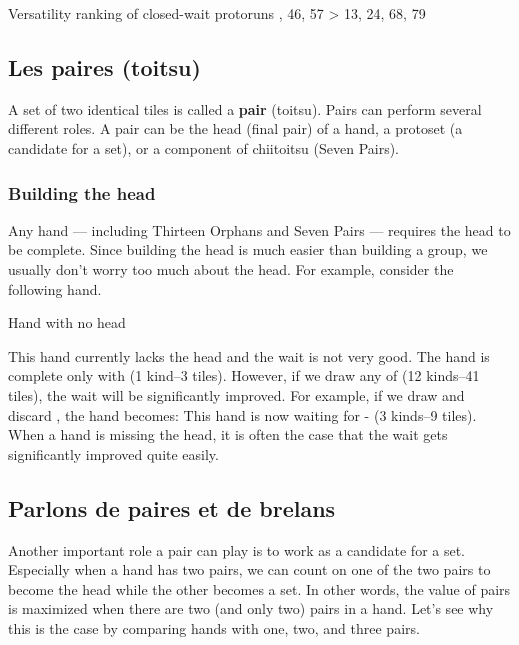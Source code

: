 {\color{MyRed}
\begin{itembox}[c]{Versatility ranking of closed-wait protoruns}
\centering{}, 46, 57 > 13, 24, 68, 79
\end{itembox} 
\normalcolor
\bigskip

\subsection{Les paires ({\jap toitsu})}\label{sec:closevers}
 

A set of two identical tiles is called a {\bf pair} ({\jap toitsu}). 
Pairs can perform several different roles. A pair can be the head (final pair) of a hand, a protoset (a candidate for a set), or a component of {\jap chiitoitsu} (Seven Pairs). 

\bigskip
\subsubsection{Building the head}
Any hand --- including Thirteen Orphans and Seven Pairs --- requires the head to be complete. Since building the head is much easier than building a group, we usually don't worry too much about the head. For example, consider the following hand. 
\bigskip
\begin{itembox}[r]{Hand with no head}
\bp
{}
\ep
\end{itembox}
This hand currently lacks the head and the wait is not very good. The hand is complete only with {\LARGE{}} (1 kind--3 tiles).
However, if we draw any of {\LARGE{}} (12 kinds--41 tiles), the wait will be significantly improved. 
For example, if we draw {\LARGE{}} and discard {\LARGE{}}, the hand becomes:
\bp
{}
\ep
This hand is now waiting for {\LARGE{} -} (3 kinds--9 tiles). 
When a hand is missing the head, it is often the case that the wait gets significantly improved quite easily. 

\subsection{Parlons de paires et de brelans} \label{sec:2pairs}
Another important role a pair can play is to work as a candidate for a set. 
Especially when a hand has two pairs, we can count on one of the two pairs to become the head while the other becomes a set. In other words, the value of pairs is maximized when there are two (and only two) pairs in a hand. Let's see why this is the case by comparing hands with one, two, and three pairs. 

}
